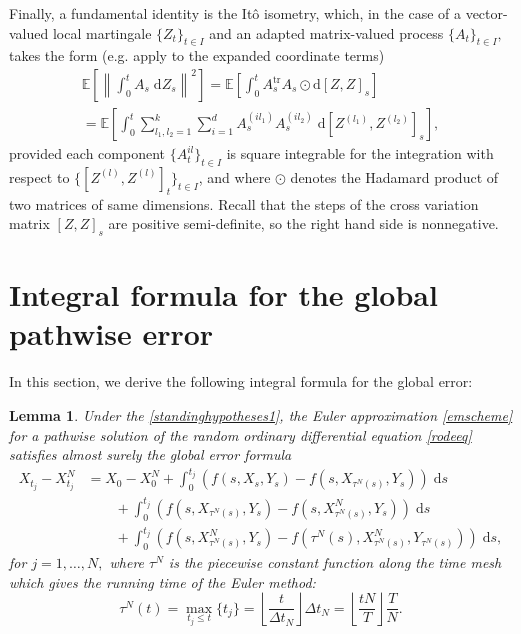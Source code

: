 \documentclass[reqno,12pt]{amsart}
\theoremstyle{plain} %
\newtheorem{lemma}{Lemma}[section]
\theoremstyle{definition} %
\newcommand{\tr}{{\operatorname{tr}}}
\begin{document}
Finally, a fundamental identity is the It\^o isometry, which, in the case of a vector-valued local martingale $\{Z_t\}_{t\in I}$ and an adapted matrix-valued process $\{A_t\}_{t\in I},$ takes the form (e.g. apply \cite[Chapter 3, Proposition 2.17]{KaratzasShreve2014} to the expanded coordinate terms)
\begin{multline}
    \label{eqitoisometrylocalmartingale}
    \mathbb{E}\left[\left\|\int_0^t A_s \;\mathrm{d}Z_s\right\|^2\right] = \mathbb{E}\left[ \int_0^t A_s^\tr A_s \odot \mathrm{d}[Z, Z]_s\right] \\ = \mathbb{E}\left[ \int_0^t \sum_{l_1, l_2 = 1}^k \sum_{i=1}^d A_s^{(il_1)}A_s^{(il_2)}\;\mathrm{d}[Z^{(l_1)}, Z^{(l_2)}]_s\right],
\end{multline}
provided each component $\{A_t^{il}\}_{t\in I}$ is square integrable for the integration with respect to $\{[Z^{(l)}, Z^{(l)}]_t\}_{t\in I}$, and where $\odot$ denotes the Hadamard product of two matrices of same dimensions. Recall that the steps of the cross variation matrix $[Z, Z]_s$ are positive semi-definite, so the right hand side is nonnegative.

\section{Integral formula for the global pathwise error}

In this section, we derive the following integral formula for the global error:
\begin{lemma}
    \label{lemglobalerrorintegralformula}
    Under the \cref{standinghypotheses1}, the Euler approximation \cref{emscheme} for a pathwise solution of the random ordinary differential equation \cref{rodeeq} satisfies almost surely the global error formula
    \begin{equation}
        \label{globalerrorintegralformula}
        \begin{aligned}
            X_{t_j} - X_{t_j}^N & = X_0 - X_0^N + \int_0^{t_j} \left( f(s, X_s, Y_s) - f(s, X_{\tau^N(s)}, Y_s) \right)\;\mathrm{d}s  \\ 
            & \qquad + \int_{0}^{t_j} \left( f(s, X_{\tau^N(s)}, Y_s) - f(s, X_{\tau^N(s)}^N, Y_s) \right)\;\mathrm{d}s \\
            & \qquad + \int_0^{t_j} \left( f(s, X_{\tau^N(s)}^N, Y_s) - f(\tau^N(s), X_{\tau^N(s)}^N, Y_{\tau^N(s)}) \right)\;\mathrm{d}s,
        \end{aligned}
    \end{equation}
    for $j = 1, \ldots, N,$ where $\tau^N$ is the piecewise constant function along the time mesh which gives the running time of the Euler method:
    \begin{equation}
        \label{tauNt}
        \tau^N(t) = \max_{t_j \leq t}\{t_j\} = \left\lfloor\frac{t}{\Delta t_N}\right\rfloor\Delta t_N = \left\lfloor\frac{tN}{T}\right\rfloor\frac{T}{N}.
    \end{equation}
\end{lemma}
\end{document}
